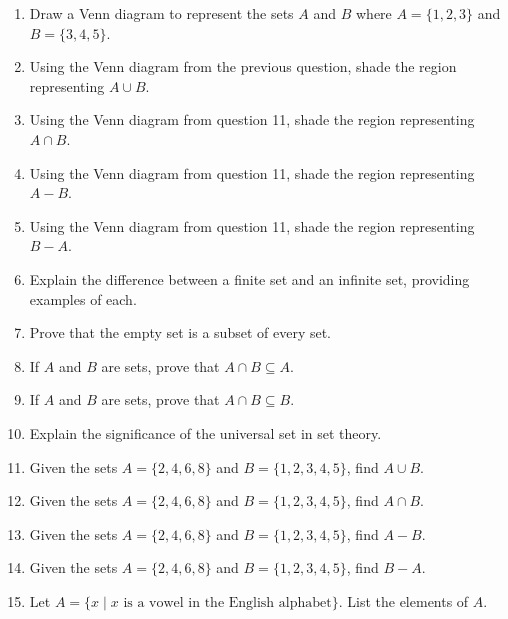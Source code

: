 \documentclass[12pt]{article}
\begin{document}
\begin{enumerate}
    \item Draw a Venn diagram to represent the sets \( A \) and \( B \) where \( A = \{1, 2, 3\} \) and \( B = \{3, 4, 5\} \).

    \item Using the Venn diagram from the previous question, shade the region representing \( A \cup B \).

    \item Using the Venn diagram from question 11, shade the region representing \( A \cap B \).

    \item Using the Venn diagram from question 11, shade the region representing \( A - B \).

    \item Using the Venn diagram from question 11, shade the region representing \( B - A \).

    \item Explain the difference between a finite set and an infinite set, providing examples of each.

    \item Prove that the empty set is a subset of every set.

    \item If \( A \) and \( B \) are sets, prove that \( A \cap B \subseteq A \).

    \item If \( A \) and \( B \) are sets, prove that \( A \cap B \subseteq B \).

    \item Explain the significance of the universal set in set theory.

    \item Given the sets \( A = \{2, 4, 6, 8\} \) and \( B = \{1, 2, 3, 4, 5\} \), find \( A \cup B \).

    \item Given the sets \( A = \{2, 4, 6, 8\} \) and \( B = \{1, 2, 3, 4, 5\} \), find \( A \cap B \).

    \item Given the sets \( A = \{2, 4, 6, 8\} \) and \( B = \{1, 2, 3, 4, 5\} \), find \( A - B \).

    \item Given the sets \( A = \{2, 4, 6, 8\} \) and \( B = \{1, 2, 3, 4, 5\} \), find \( B - A \).

    \item Let \( A = \{x \mid x \text{ is a vowel in the English alphabet} \} \). List the elements of \( A \).


\end{enumerate}
\end{document}
